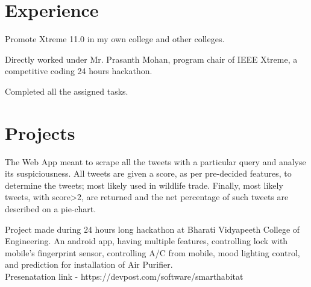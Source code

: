 \documentclass[]{deedy-resume-openfont}
\begin{document}
\begin{minipage}[t]{0.60\textwidth} 

\section{Experience }



\vspace{\topsep} %
\begin{tightemize}
\item  Promote Xtreme 11.0 in my own college and other colleges.\item Directly worked under Mr. Prasanth Mohan, program chair of IEEE Xtreme, a competitive coding 24 hours hackathon. \item Completed all the assigned tasks. %
\end{tightemize}
\sectionsep



\section{Projects}


The Web App meant to scrape all the tweets with a particular query and analyse its suspiciousness. All tweets are given a score, as per pre-decided features, to determine the tweets; most likely used in wildlife trade. Finally, most likely tweets, with score>2, are returned and the net percentage of such tweets are described on a pie-chart.
\sectionsep

Project made during 24 hours long hackathon at Bharati Vidyapeeth College of Engineering. An android app, having multiple features, controlling lock with mobile's fingerprint sensor, controlling A/C from mobile, mood lighting control, and prediction for installation of Air Purifier.\\ Presenatation link - https://devpost.com/software/smarthabitat
\sectionsep


\end{minipage}
\end{document}
